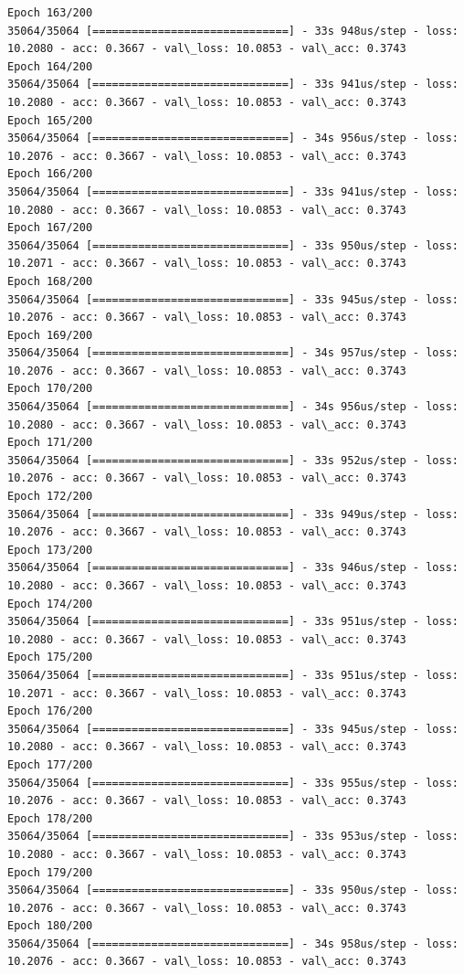 \documentclass[11pt]{article}
\begin{document}
\begin{Verbatim}[commandchars=\\\{\}]
Epoch 163/200
35064/35064 [==============================] - 33s 948us/step - loss: 10.2080 - acc: 0.3667 - val\_loss: 10.0853 - val\_acc: 0.3743
Epoch 164/200
35064/35064 [==============================] - 33s 941us/step - loss: 10.2080 - acc: 0.3667 - val\_loss: 10.0853 - val\_acc: 0.3743
Epoch 165/200
35064/35064 [==============================] - 34s 956us/step - loss: 10.2076 - acc: 0.3667 - val\_loss: 10.0853 - val\_acc: 0.3743
Epoch 166/200
35064/35064 [==============================] - 33s 941us/step - loss: 10.2080 - acc: 0.3667 - val\_loss: 10.0853 - val\_acc: 0.3743
Epoch 167/200
35064/35064 [==============================] - 33s 950us/step - loss: 10.2071 - acc: 0.3667 - val\_loss: 10.0853 - val\_acc: 0.3743
Epoch 168/200
35064/35064 [==============================] - 33s 945us/step - loss: 10.2076 - acc: 0.3667 - val\_loss: 10.0853 - val\_acc: 0.3743
Epoch 169/200
35064/35064 [==============================] - 34s 957us/step - loss: 10.2076 - acc: 0.3667 - val\_loss: 10.0853 - val\_acc: 0.3743
Epoch 170/200
35064/35064 [==============================] - 34s 956us/step - loss: 10.2080 - acc: 0.3667 - val\_loss: 10.0853 - val\_acc: 0.3743
Epoch 171/200
35064/35064 [==============================] - 33s 952us/step - loss: 10.2076 - acc: 0.3667 - val\_loss: 10.0853 - val\_acc: 0.3743
Epoch 172/200
35064/35064 [==============================] - 33s 949us/step - loss: 10.2076 - acc: 0.3667 - val\_loss: 10.0853 - val\_acc: 0.3743
Epoch 173/200
35064/35064 [==============================] - 33s 946us/step - loss: 10.2080 - acc: 0.3667 - val\_loss: 10.0853 - val\_acc: 0.3743
Epoch 174/200
35064/35064 [==============================] - 33s 951us/step - loss: 10.2080 - acc: 0.3667 - val\_loss: 10.0853 - val\_acc: 0.3743
Epoch 175/200
35064/35064 [==============================] - 33s 951us/step - loss: 10.2071 - acc: 0.3667 - val\_loss: 10.0853 - val\_acc: 0.3743
Epoch 176/200
35064/35064 [==============================] - 33s 945us/step - loss: 10.2080 - acc: 0.3667 - val\_loss: 10.0853 - val\_acc: 0.3743
Epoch 177/200
35064/35064 [==============================] - 33s 955us/step - loss: 10.2076 - acc: 0.3667 - val\_loss: 10.0853 - val\_acc: 0.3743
Epoch 178/200
35064/35064 [==============================] - 33s 953us/step - loss: 10.2080 - acc: 0.3667 - val\_loss: 10.0853 - val\_acc: 0.3743
Epoch 179/200
35064/35064 [==============================] - 33s 950us/step - loss: 10.2076 - acc: 0.3667 - val\_loss: 10.0853 - val\_acc: 0.3743
Epoch 180/200
35064/35064 [==============================] - 34s 958us/step - loss: 10.2076 - acc: 0.3667 - val\_loss: 10.0853 - val\_acc: 0.3743

\end{Verbatim}
\end{document}
